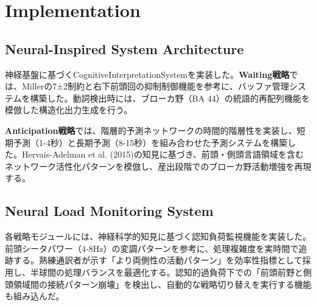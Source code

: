 \section{Implementation}

\subsection{Neural-Inspired System Architecture}

神経基盤に基づくCognitiveInterpretationSystemを実装した。\textbf{Waiting戦略}では、Millerの7±2制約と右下前頭回の抑制制御機能を参考に、バッファ管理システムを構築した。動詞検出時には、ブローカ野（BA 44）の統語的再配列機能を模倣した構造化出力生成を行う。

\textbf{Anticipation戦略}では、階層的予測ネットワークの時間的階層性を実装し、短期予測（1-4秒）と長期予測（8-15秒）を組み合わせた予測システムを構築した。Hervais-Adelman et al. (2015)の知見に基づき、前頭・側頭言語領域を含むネットワーク活性化パターンを模倣し、産出段階でのブローカ野活動増強を再現する。 

\subsection{Neural Load Monitoring System}

各戦略モジュールには、神経科学的知見に基づく認知負荷監視機能を実装した。前頭シータパワー（4-8Hz）の変調パターンを参考に、処理複雑度を実時間で追跡する。熟練通訳者が示す「より両側性の活動パターン」を効率性指標として採用し、半球間の処理バランスを最適化する。認知的過負荷下での「前頭前野と側頭領域間の接続パターン崩壊」を検出し、自動的な戦略切り替えを実行する機能も組み込んだ。 